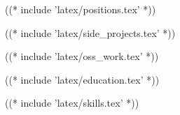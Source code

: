 \documentclass[10pt]{barag_resume}
\begin{document}
    ((* include 'latex/positions.tex' *))

    ((* include 'latex/side_projects.tex' *))

    \newpage %
    ((* include 'latex/oss_work.tex' *))

    ((* include 'latex/education.tex' *))

    ((* include 'latex/skills.tex' *))
\end{document}
